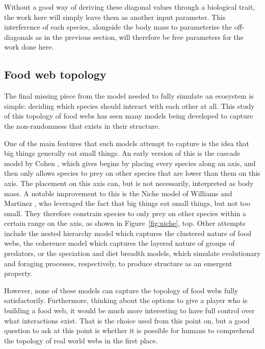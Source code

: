 Without a good way of deriving these diagonal values through a biological trait, the work here will simply leave them as another input parameter. This interference of each species, alongside the body mass to parameterise the off-diagonals as in the previous section, will therefore be free parameters for the work done here. 


\subsection{Food web topology}
\label{sec:topology}
The final missing piece from the model needed to fully simulate an ecosystem is simple: deciding which species should interact with each other at all.
This study of this topology of food webs has seen many models being developed to capture the non-randomness that exists in their structure.

One of the main features that such models attempt to capture is the idea that big things generally eat small things. An early version of this is the cascade model by Cohen \cite{Cohen2012}, which gives begins by placing every species along an axis, and then only allows species to prey on other species that are lower than them on this axis. The placement on this axis can, but is not necessarily, interpreted as body mass.
A notable improvement to this is the Niche model of Williams and Martinez \cite{Williams2000}, who leveraged the fact that big things eat small things, but not too small. They therefore constrain species to only prey on other species within a certain range on the axis, as shown in Figure~\ref{fig:niche}, top.
Other attempts include the nested hierarchy model \cite{Cattin2004} which captures the clustered nature of food webs, the coherence model \cite{Johnson2014} which captures the layered nature of groups of predators, or the speciation \cite{Rossberg2006} and diet breadth \cite{Petchey2008} models, which simulate evolutionary and foraging processes, respectively, to produce structure as an emergent property. 

However, none of these models can capture the topology of food webs fully satisfactorily. Furthermore, thinking about the options to give a player who is building a food web, it would be much more interesting to have full control over what interactions exist. That is the choice used from this point on, but a good question to ask at this point is whether it is possible for humans to comprehend the topology of real world webs in the first place.

